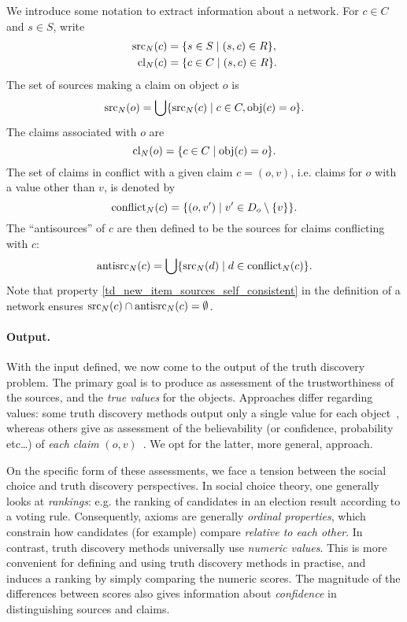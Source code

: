 We introduce some notation to extract information about a network. For $c \in
C$ and $s \in S$, write
\begin{align*}
    \operatorname{src}_N(c) &= \{s \in S \mid (s, c) \in R\},\\
    \operatorname{cl}_N(c) &= \{c \in C \mid (s, c) \in R\}.
\end{align*}
The set of sources making a claim on object $o$ is
\[
    \operatorname{src}_N(o) = \bigcup\{\operatorname{src}_N(c) \mid c \in C, \operatorname{obj}(c) = o\}.
\]
The claims associated with $o$ are
\[
    \operatorname{cl}_N(o) = \{c \in C \mid \operatorname{obj}(c) = o\}.
\]
The set of claims in conflict with a given claim $c = (o, v)$, i.e.  claims for
$o$ with a value other than $v$, is denoted by
\[
    \operatorname{conflict}_N(c) = \{(o, v') \mid v' \in D_o \setminus \{v\}\}.
\]
The ``antisources'' of $c$ are then defined to be the sources for claims
conflicting with $c$:
\[
    \operatorname{antisrc}_N(c) = \bigcup\{\operatorname{src}_N(d) \mid d \in \operatorname{conflict}_N(c)\}.
\]
Note that property \cref{td_new_item_sources_self_consistent} in the definition
of a network ensures $\operatorname{src}_N(c) \cap \operatorname{antisrc}_N(c) = \emptyset$.

\paragraph{Output.}

With the input defined, we now come to the output of the truth discovery
problem.
The primary goal is to produce as assessment of the trustworthiness of the
sources, and the \emph{true values} for the objects. Approaches differ
regarding values: some truth discovery methods output only a single value for
each object~\cite{li2016,ding_finding_2016,yang_continuous_2018}, whereas
others give as assessment of the believability (or confidence, probability
etc\ldots) of \emph{each claim} $(o,
v)$~\cite{yin2008,pasternack2010,galland2010,zhi2015,zhang_robust_2016,zhang2018}.
We opt for the latter, more general, approach.

On the specific form of these assessments, we face a tension between the social
choice and truth discovery perspectives. In social choice theory, one generally
looks at \emph{rankings}: e.g. the ranking of candidates in an election result
according to a voting rule. Consequently, axioms are generally \emph{ordinal
properties}, which constrain how candidates (for example) compare
\emph{relative to each other}. In contrast, truth discovery methods universally
use \emph{numeric values}. This is more convenient for defining and using truth
discovery methods in practise, and induces a ranking by simply comparing the
numeric scores. The magnitude of the differences between scores also gives
information about \emph{confidence} in distinguishing sources and claims.

